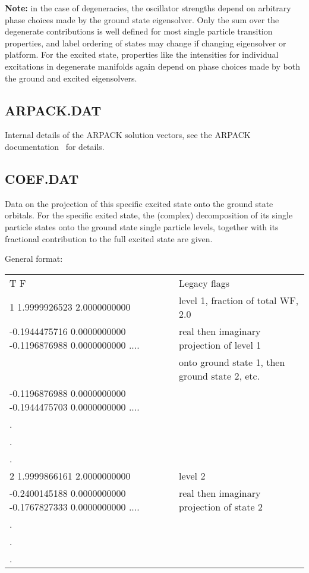 \textbf{Note:} in the case of degeneracies, the oscillator strengths depend on
arbitrary phase choices made by the ground state eigensolver. Only the sum over
the degenerate contributions is well defined for most single particle transition
properties, and label ordering of states may change if changing eigensolver or
platform. For the excited state, properties like the intensities for
individual excitations in degenerate manifolds again depend on phase choices
made by both the ground and excited eigensolvers.


\subsection{ARPACK.DAT}

Internal details of the ARPACK solution vectors, see the ARPACK
documentation~\cite{Lehoucq97arpackusers} for details.

\subsection{COEF.DAT}

Data on the projection of this specific excited state onto the ground state
orbitals. For the specific exited state, the (complex) decomposition of its
single particle states onto the ground state single particle levels, together
with its fractional contribution to the full excited state are given.

General format:

\begin{tabular}{|l|l|}
\hline
{\small T F                                }&Legacy flags\\
{\small   1  1.9999926523  2.0000000000    }&level 1, fraction of total WF, 2.0\\
{\small-0.1944475716  0.0000000000 -0.1196876988  0.0000000000 ....    }&real then
imaginary projection of level 1\\
                                    &onto ground state 1, then ground state 2, etc.\\
{\small-0.1196876988  0.0000000000 -0.1944475703  0.0000000000 ....    }&\\
{\small.}&\\
{\small.}&\\
{\small.}&\\
{\small   2  1.9999866161  2.0000000000    }&level 2\\
{\small-0.2400145188  0.0000000000 -0.1767827333  0.0000000000 ....}& real then
imaginary projection of state 2\\
{\small.}&\\
{\small.}&\\
{\small.}&\\ \hline
\end{tabular}

